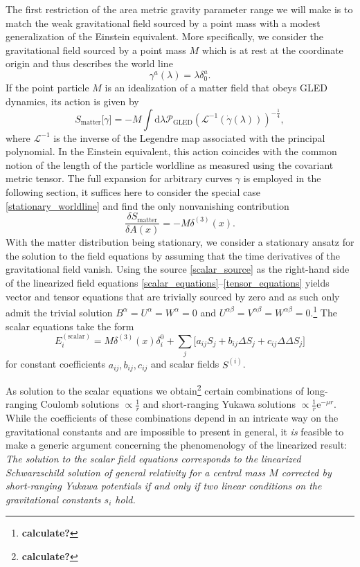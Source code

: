 The first restriction of the area metric gravity parameter range we will make is to match the weak gravitational field sourced by a point mass with a modest generalization of the Einstein equivalent. More specifically, we consider the gravitational field sourced by a point mass $M$ which is at rest at the coordinate origin and thus describes the world line
\begin{equation}\label{stationary_worldline}
  \gamma^a(\lambda) = \lambda \delta^a_0.
\end{equation}
If the point particle $M$ is an idealization of a matter field that obeys GLED dynamics, its action is given by \cite{sergio}
\begin{equation}
  S_\text{matter}\lbrack\gamma\rbrack = -M \int \mathrm d\lambda \mathcal P_\text{GLED}(\mathcal L^{-1}(\dot\gamma(\lambda)))^{-\frac{1}{4}},
\end{equation}
where $\mathcal L^{-1}$ is the inverse of the Legendre map associated with the principal polynomial. In the Einstein equivalent, this action coincides with the common notion of the length of the particle worldline as measured using the covariant metric tensor. The full expansion for arbitrary curves $\gamma$ is employed in the following section, it suffices here to consider the special case \eqref{stationary_worldline} and find the only nonvanishing contribution
\begin{equation}\label{scalar_source}
  \frac{\delta S_\text{matter}}{\delta A(x)} = -M\delta^{(3)}(x).
\end{equation}
With the matter distribution being stationary, we consider a stationary ansatz for the solution to the field equations by assuming that the time derivatives of the gravitational field vanish. Using the source \eqref{scalar_source} as the right-hand side of the linearized field equations \eqref{scalar_equations}--\eqref{tensor_equations} yields vector and tensor equations that are trivially sourced by zero and as such only admit the trivial solution $B^\alpha = U^\alpha = W^\alpha = 0$ and $U^{\alpha\beta} = V^{\alpha\beta} = W^{\alpha\beta} = 0$.\footnote{\textbf{calculate?}} The scalar equations take the form
\begin{equation}
  E_i^{(\text{scalar})} = M \delta^{(3)}(x) \delta^0_i + \sum_j\lbrack a_{ij} S_j + b_{ij} \Delta S_j + c_{ij} \Delta\Delta S_j\rbrack
\end{equation}
for constant coefficients $a_{ij}, b_{ij}, c_{ij}$ and scalar fields $S^{(i)}$.

As solution to the scalar equations we obtain\footnote{\textbf{calculate?}} certain combinations of long-ranging Coulomb solutions $\propto \frac{1}{r}$ and short-ranging Yukawa solutions $\propto \frac{1}{r} \mathrm e^{-\mu r}$. While the coefficients of these combinations depend in an intricate way on the gravitational constants and are impossible to present in general, it \emph{is} feasible to make a generic argument concerning the phenomenology of the linearized result: \emph{The solution to the scalar field equations corresponds to the linearized Schwarzschild solution of general relativity for a central mass $M$ corrected by short-ranging Yukawa potentials if and only if two linear conditions on the gravitational constants $s_i$ hold.}

